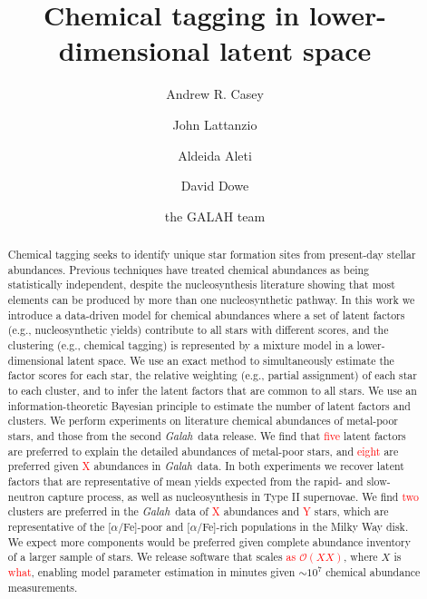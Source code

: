 \documentclass[twocolumn]{aastex62}
\newcommand{\project}[1]{\textsl{#1}}
\newcommand{\Galah}{\project{Galah}}
\newcommand{\todo}[1]{\textcolor{red}{#1}}
\begin{document}
\title{Chemical tagging in lower-dimensional latent space}


\author[0000-0003-0174-0564]{Andrew R. Casey}
			 
\author{John Lattanzio}

\author{Aldeida Aleti}

\author{David Dowe}
			 
\author{the GALAH team}


\begin{abstract}
Chemical tagging seeks to identify unique star formation sites from
present-day stellar abundances.
Previous techniques have treated chemical abundances as being 
statistically independent, despite the nucleosynthesis literature showing that
most elements can be produced by more than one nucleosynthetic pathway.
In this work we introduce a data-driven model for chemical abundances
where a set of latent factors (e.g., nucleosynthetic yields) contribute
to all stars with different scores, and the clustering (e.g., chemical tagging) 
is represented by a mixture model in a lower-dimensional latent space.
We use an exact method to simultaneously estimate the factor scores for
each star, the relative weighting (e.g., partial assignment) of each star
to each cluster, and to infer the latent factors that are common to all stars.
We use an information-theoretic Bayesian principle to estimate the number of
latent factors and clusters.
We perform experiments on literature chemical abundances
of metal-poor stars, and those from the second \Galah\ data release. 
We find that \todo{five} latent factors are preferred to explain the detailed 
abundances of metal-poor stars, and \todo{eight} are preferred given \todo{X} abundances
in \Galah\ data. In both experiments we recover latent factors that 
are representative of mean yields expected from the rapid- and slow-neutron
capture process, as well as nucleosynthesis in Type II supernovae. 
We find \todo{two} clusters are preferred in the \Galah\ data of \todo{X} abundances
and \todo{Y} stars, which are representative of the [$\alpha$/Fe]-poor and 
[$\alpha$/Fe]-rich populations in the Milky Way disk. We expect more components
would be preferred given complete abundance inventory of a larger sample of stars.
We release software that scales \todo{as $\mathcal{O}(XX)$}, where $X$ is \todo{what},
enabling model parameter estimation in minutes given $\sim$$10^7$
chemical abundance measurements.
\end{abstract}
\end{document}
